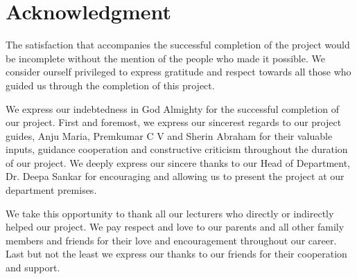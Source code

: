 \chapter*{Acknowledgment}
The satisfaction that accompanies the successful completion of the project would be incomplete without the mention of the people who made it possible. We consider ourself privileged to express gratitude and respect towards all those who guided us through the completion of this project.

We express our indebtedness in God Almighty for the successful completion of our project. First and foremost, we express our sincerest regards to our project guides, Anju Maria, Premkumar C V and Sherin Abraham for their valuable inputs, guidance cooperation and constructive criticism throughout the duration of our project. We deeply express our sincere thanks to our Head of Department, Dr. Deepa Sankar for encouraging and allowing us to present the project at our department premises.

We take this opportunity to thank all our lecturers who directly or indirectly helped our project. We pay respect and love to our parents and all other family members and friends for their love and encouragement throughout our career. Last but not the least we express our thanks to our friends for their cooperation and support.